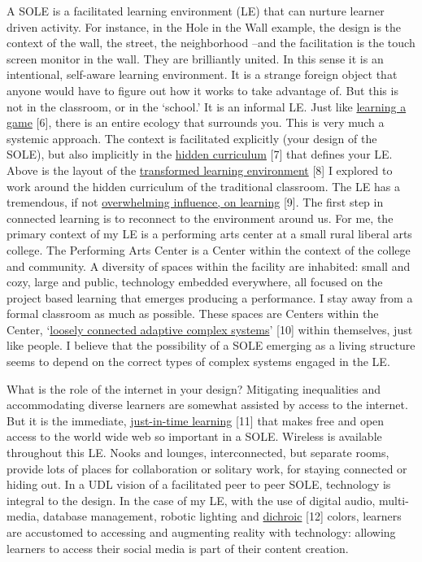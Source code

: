 A SOLE is a
facilitated learning environment (LE) that can nurture learner driven
activity. For instance, in the Hole in the Wall example, the design is
the context of the wall, the street, the neighborhood --and the
facilitation is the touch screen monitor in the wall. They are
brilliantly united. In this sense it is an intentional, self-aware
learning environment. It is a strange foreign object that anyone would
have to figure out how it works to take advantage of. But this is not in
the classroom, or in the `school.' It is an informal LE. Just
like
\href{http://www.academia.edu/1137269/Game-based\_Learning\_and\_Intrinsic\_Motivation}{learning
a game} {[}6{]}, there is an entire ecology that surrounds you. This is
very much a systemic approach. The context is facilitated explicitly
(your design of the SOLE), but also implicitly in the
\href{http://en.wikipedia.org/wiki/Hidden\_curriculum}{hidden
curriculum} {[}7{]} that defines your LE. Above is the layout of the
\href{http://www.scribd.com/doc/181089012/Transformed-Learning-Environment-Analysis}{transformed
learning environment} {[}8{]} I explored to work around the hidden
curriculum of the traditional classroom. The LE has a tremendous, if not
\href{http://scholar.lib.vt.edu/theses/available/etd-09232007-220306/unrestricted/SElmasryETDbodytext.pdf}{overwhelming
influence, on learning} {[}9{]}. The first step in connected learning is
to reconnect to the environment around us. For me, the primary context
of my LE is a performing arts center at a small rural liberal arts
college. The Performing Arts Center is a Center within the context of
the college and community. A diversity of spaces within the facility are
inhabited: small and cozy, large and public, technology embedded
everywhere, all focused on the project based learning that emerges
producing a performance. I stay away from a formal classroom as much as
possible. These spaces are Centers within the Center,
`\href{http://nourdiab.wordpress.com/2011/02/23/the-theories-of-christopher-alexander/}{loosely
connected adaptive complex systems}' {[}10{]} within themselves, just
like people. I believe that the possibility of a SOLE emerging as a
living structure seems to depend on the correct types of complex systems
engaged in the LE.

What is the role of the internet in your design? Mitigating inequalities
and accommodating diverse learners are somewhat assisted by access to
the internet. But it is the immediate,
\href{http://www.wordstream.com/blog/ws/2013/10/02/just-in-time-information-hacks}{just-in-time
learning} {[}11{]} that makes free and open access to the world wide web
so important in a SOLE. Wireless is available throughout this LE. Nooks
and lounges, interconnected, but separate rooms, provide lots of places
for collaboration or solitary work, for staying connected or hiding out.
In a UDL vision of a facilitated peer to peer SOLE, technology is
integral to the design. In the case of my LE, with the use of digital
audio, multi-media, database management, robotic lighting and
\href{http://en.wikipedia.org/wiki/Dichroic\_filter}{dichroic} {[}12{]}
colors, learners are accustomed to accessing and augmenting reality with
technology: allowing learners to access their social media is part of
their content creation.

